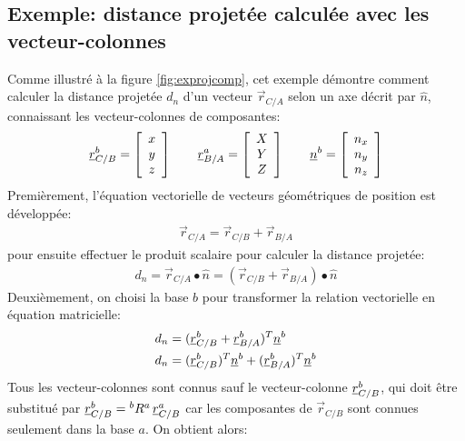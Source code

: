 \subsection{Exemple: distance projetée calculée avec les vecteur-colonnes}
%
Comme illustré à la figure \ref{fig:exprojcomp}, cet exemple démontre comment calculer la distance projetée $d_n$ d'un vecteur $\vec{r}_{C/A}$ selon un axe décrit par $\hat{n}$, connaissant les vecteur-colonnes de composantes:
\begin{align}
\underline{r}_{C/B}^b = \left[ \begin{array}{c} x \\ y \\ z  \end{array} \right]
\quad\quad
\underline{r}_{B/A}^a = \left[ \begin{array}{c} X \\ Y \\ Z  \end{array} \right]
\quad\quad
\underline{n}^b       = \left[ \begin{array}{c} n_x \\ n_y \\ n_z  \end{array} \right]
\label{eq:disprojexdef}
\end{align} 
Premièrement, l'équation vectorielle de vecteurs géométriques de position est développée:
\begin{align}
\vec{r}_{C/A} = \vec{r}_{C/B} + \vec{r}_{B/A}
\end{align} 
pour ensuite effectuer le produit scalaire pour calculer la distance projetée:
\begin{align}
d_n = \vec{r}_{C/A} \bullet \hat{n} = (\vec{r}_{C/B} + \vec{r}_{B/A} ) \bullet \hat{n} 
\end{align} 
Deuxièmement, on choisi la base $b$ pour transformer la relation vectorielle en équation matricielle:
\begin{align}
d_n &= (\underline{r}_{C/B}^b + \underline{r}_{B/A}^b )^T \underline{n}^b \\
d_n &= ( \underline{r}_{C/B}^b )^T \underline{n}^b + ( \underline{r}_{B/A}^b )^T \underline{n}^b
\end{align} 
Tous les vecteur-colonnes sont connus sauf le vecteur-colonne $\underline{r}_{C/B}^b$, qui doit être substitué par $\underline{r}_{C/B}^b = {}^bR^a \, \underline{r}_{C/B}^a$ car les composantes de $\vec{r}_{C/B}$ sont connues seulement dans la base $a$. On obtient alors:
